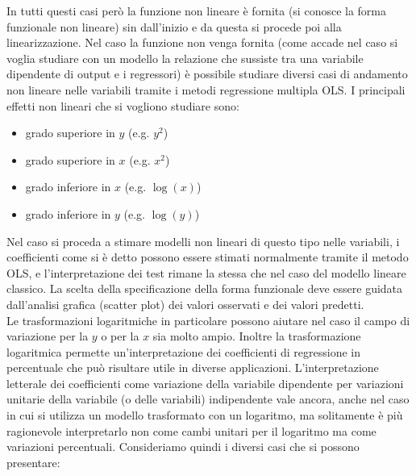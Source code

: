 In tutti questi casi però la funzione non lineare è fornita (si conosce la forma funzionale non lineare) sin dall'inizio e da questa si procede poi alla linearizzazione. Nel caso la funzione non venga fornita (come accade nel caso si voglia studiare con un modello la relazione che sussiste tra una variabile dipendente di output e i regressori) è possibile studiare diversi casi di andamento non lineare nelle variabili tramite i metodi regressione multipla OLS. I principali effetti non lineari che si vogliono studiare sono:
\begin{itemize}
	\item grado superiore in $y$ (e.g. $y^2$)
	\item grado superiore in $x$ (e.g. $x^2$)
	\item grado inferiore in $x$ (e.g. $\log(x)$)
	\item grado inferiore in $y$ (e.g. $\log(y)$)
\end{itemize}
Nel caso si proceda a stimare modelli non lineari di questo tipo nelle variabili, i coefficienti come si è detto possono essere stimati normalmente tramite il metodo OLS, e l'interpretazione dei test rimane la stessa che nel caso del modello lineare classico. La scelta della specificazione della forma funzionale deve essere guidata dall'analisi grafica (scatter plot) dei valori osservati e dei valori predetti.\\
Le trasformazioni logaritmiche in particolare possono aiutare nel caso il campo di variazione per la $y$ o per la $x$ sia molto ampio. Inoltre la trasformazione logaritmica permette un'interpretazione dei coefficienti di regressione in percentuale che può risultare utile in diverse applicazioni. L'interpretazione letterale dei coefficienti come variazione della variabile dipendente per variazioni unitarie della variabile (o delle variabili) indipendente vale ancora, anche nel caso in cui si utilizza un modello trasformato con un logaritmo, ma solitamente è più ragionevole interpretarlo non come cambi unitari per il logaritmo ma come variazioni percentuali. Consideriamo quindi i diversi casi che si possono presentare:
